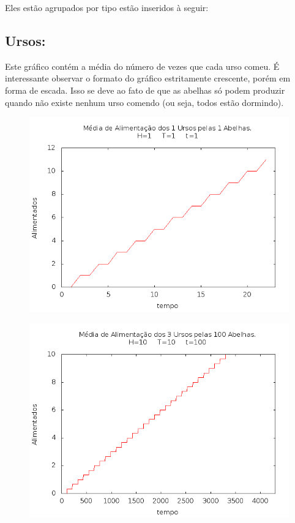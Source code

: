 \documentclass[12pt,a4paper]{article}
\begin{document}
Eles estão agrupados por tipo estão inseridos à seguir:

\clearpage
\subsection{Ursos:}

Este gráfico contém a média do número de vezes que cada urso comeu. É interessante observar o formato do gráfico estritamente crescente, porém em forma de escada. Isso se deve ao fato de que as abelhas só podem produzir quando não existe nenhum urso comendo (ou seja, todos estão dormindo).

\begin{figure}[!htb]
\centering
\includegraphics[width=0.7\paperwidth]{./graficos/ursos_1_1_1_1_1.png}
\label{Rotulo}
\end{figure}

\begin{figure}[!htb]
\centering
\includegraphics[width=0.7\paperwidth]{./graficos/ursos_100_3_10_100_10.png}
\label{Rotulo}
\end{figure}
\end{document}
